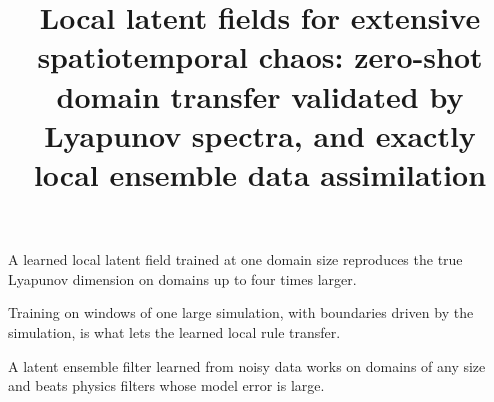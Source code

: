 \documentclass[draft]{PJ2019}
\begin{document}
\title{Local latent fields for extensive spatiotemporal chaos: zero-shot domain transfer
validated by Lyapunov spectra, and exactly local ensemble data assimilation}




\begin{keypoints}
\item A learned local latent field trained at one domain size reproduces the true Lyapunov dimension on domains up to four times larger.
\item Training on windows of one large simulation, with boundaries driven by the simulation, is what lets the learned local rule transfer.
\item A latent ensemble filter learned from noisy data works on domains of any size and beats physics filters whose model error is large.
\end{keypoints}
\end{document}
